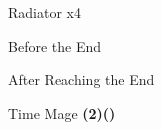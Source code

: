 \begin{paracol}{2}
\switchcolumn*
\begin{encounter}{Radiator x4}
	\varwb
	\begin{notes}
		\item {}
	\end{notes}
	\begin{round}{1}
		\bartz \leftCommand{\throw} \then \flameScroll
	\end{round}
	\varwe
\end{encounter}

\switchcolumn
\begin{steproute}{Before the End}
\end{steproute}

\switchcolumn
\begin{menu}{After Reaching the End}
    \varwb
    \begin{jobMenu}
        \lenna Time Mage \textbf{(2\pointLeft)(\pointUp)}
    \end{jobMenu}
    \begin{magicMenu}
        \lenna \exit
    \end{magicMenu}
    \varwe
\end{menu}

\end{paracol}